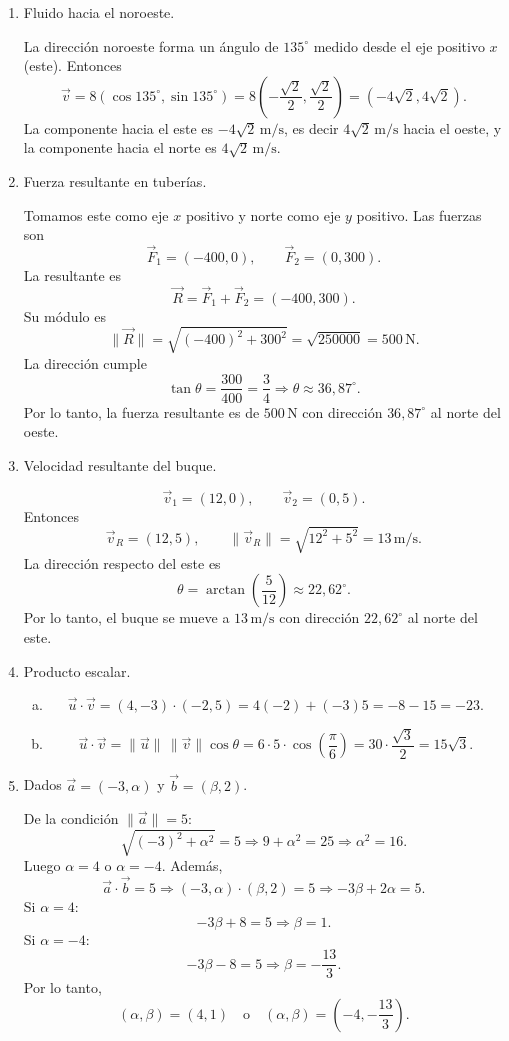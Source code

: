 \begin{enumerate}[\hspace{-3mm}$1)$]
\item Fluido hacia el noroeste.
\begin{sol}
La dirección noroeste forma un ángulo de $135^\circ$ medido desde el eje positivo $x$ (este). Entonces
\[
\vec v=8(\cos135^\circ,\sin135^\circ)
=8\left(-\frac{\sqrt2}{2},\frac{\sqrt2}{2}\right)=(-4\sqrt2,4\sqrt2).
\]
La componente hacia el este es $-4\sqrt2\,\text{m/s}$, es decir $4\sqrt2\,\text{m/s}$ hacia el oeste, y la componente hacia el norte es $4\sqrt2\,\text{m/s}$.
\end{sol}

\item Fuerza resultante en tuberías.
\begin{sol}
Tomamos este como eje $x$ positivo y norte como eje $y$ positivo. Las fuerzas son
\[
\vec F_1=(-400,0),\qquad \vec F_2=(0,300).
\]
La resultante es
\[
\vec R=\vec F_1+\vec F_2=(-400,300).
\]
Su módulo es
\[
\|\vec R\|=\sqrt{(-400)^2+300^2}=\sqrt{250000}=500\,\text{N}.
\]
La dirección cumple
\[
\tan\theta=\frac{300}{400}=\frac34\Rightarrow \theta\approx36,87^\circ.
\]
Por lo tanto, la fuerza resultante es de $500\,\text{N}$ con dirección $36,87^\circ$ al norte del oeste.
\end{sol}

\item Velocidad resultante del buque.
\begin{sol}
\[
\vec v_1=(12,0),\qquad \vec v_2=(0,5).
\]
Entonces
\[
\vec v_R=(12,5),\qquad \|\vec v_R\|=\sqrt{12^2+5^2}=13\,\text{m/s}.
\]
La dirección respecto del este es
\[
\theta=\arctan\left(\frac5{12}\right)\approx22,62^\circ.
\]
Por lo tanto, el buque se mueve a $13\,\text{m/s}$ con dirección $22,62^\circ$ al norte del este.
\end{sol}

\item Producto escalar.
\begin{sol}
\begin{enumerate}[a)]
\item
\[
\vec u\cdot\vec v=(4,-3)\cdot(-2,5)=4(-2)+(-3)5=-8-15=-23.
\]
\item
\[
\vec u\cdot\vec v=\|\vec u\|\,\|\vec v\|\cos\theta=6\cdot5\cdot\cos\left(\frac\pi6\right)=30\cdot\frac{\sqrt3}{2}=15\sqrt3.
\]
\end{enumerate}
\end{sol}

\item Dados $\vec a=(-3,\alpha)$ y $\vec b=(\beta,2)$.
\begin{sol}
De la condición $\|\vec a\|=5$:
\[
\sqrt{(-3)^2+\alpha^2}=5\Rightarrow 9+\alpha^2=25\Rightarrow \alpha^2=16.
\]
Luego $\alpha=4$ o $\alpha=-4$.
Además,
\[
\vec a\cdot\vec b=5\Rightarrow (-3,\alpha)\cdot(\beta,2)=5\Rightarrow -3\beta+2\alpha=5.
\]
Si $\alpha=4$:
\[
-3\beta+8=5\Rightarrow \beta=1.
\]
Si $\alpha=-4$:
\[
-3\beta-8=5\Rightarrow \beta=-\frac{13}{3}.
\]
Por lo tanto,
\[
\boxed{(\alpha,\beta)=(4,1)\quad\text{o}\quad (\alpha,\beta)=\left(-4,-\frac{13}{3}\right).}
\]
\end{sol}


\end{enumerate}
